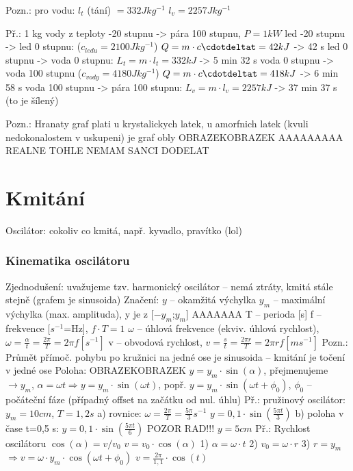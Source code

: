 \documentclass{article}
\begin{document}
Pozn.: pro vodu: $l_t$ (tání) $= 332 Jkg^{-1}$
$l_v = 2257 Jkg^{-1}$

Př.: 1 kg vody z teploty -20 stupnu -> pára 100 stupnu, $P = 1 kW$
led -20 stupnu -> led 0 stupnu: ($c_{ledu} = 2100 Jkg^{-1}$) $Q = m\cdot c\cdotdeltat = 42 kJ$ -> 42 s
led 0 stupnu -> voda 0 stupnu: $L_t = m\cdot l_t = 332 kJ$ -> 5 min 32 s
voda 0 stupnu -> voda 100 stupnu ($c_{vody} = 4180 Jkg^{-1}$) $Q = m\cdot c\cdotdeltat = 418 kJ$ -> 6 min 58 s
voda 100 stupnu -> pára 100 stupnu: $L_v = m\cdot l_v = 2257 kJ$ -> 37 min 37 s (to je šílený)

Pozn.: Hranaty graf plati u krystalickych latek, u amorfnich latek (kvuli nedokonalostem v uskupeni) je graf obly OBRAZEKOBRAZEK
AAAAAAAAA REALNE TOHLE NEMAM SANCI DODELAT

\part{Kmitání}
Oscilátor: cokoliv co kmitá, např. kyvadlo, pravítko (lol)

\section{Kinematika oscilátoru}
Zjednodušení: uvažujeme tzv. harmonický oscilátor -- nemá ztráty, kmitá stále stejně (grafem je sinusoida)
Značení: $y$ -- okamžitá výchylka
         $y_m$ -- maximální výchylka (max. amplituda), y je z [$-y_m$;$y_m$] AAAAAAA
         T -- perioda [s]
         f -- frekvence [$s^{-1}$=Hz], $f\cdot T=1$
        $\omega$ -- úhlová frekvence (ekviv. úhlová rychlost), $\omega=\frac{\alpha}{t}=\frac{2\pi}{T}=2\pi f [s^{-1}]$
        v -- obvodová rychlost, $v=\frac{s}{t}=\frac{2\pi r}{T}=2\pi rf [ms^{-1}]$
Pozn.: Průmět přímoč. pohybu po kružnici na jedné ose je sinusoida -- kmitání je točení v jedné ose
Poloha: OBRAZEKOBRAZEK $y=y_m\cdot \sin(\alpha)$, přejmenujeme $\rightarrow y_m$, $\alpha = \omega t \Rightarrow y=y_m\cdot \sin(\omega t)$, popř. $y=y_m\cdot \sin(\omega t+{\phi}_0)$, ${\phi}_0$ -- počáteční fáze (případný offset na začátku od nul. úhlu)
Př.: pružinový oscilátor: $y_m=10cm$, $T=1,2s$
        a) rovnice: $\omega = \frac{2\pi}{T}=\frac{5\pi}{3}s^{-1}$
                    $y=0,1\cdot \sin(\frac{5\pi t}{3})$
        b) poloha v čase t=0,5 s: $y=0,1\cdot \sin(\frac{5\pi t}{6})$ POZOR RAD!!!
                                  $y=5cm$
Př.: Rychlost oscilátoru
     $\cos (\alpha) = v/v_0$
     $v=v_0\cdot \cos (\alpha)$
        1) $\alpha = \omega \cdot t$
        2) $v_0 = \omega \cdot r$
        3) $r = y_m$
     $\Rightarrow v = \omega \cdot y_m \cdot \cos(\omega t + {\phi}_0)$
     $v = \frac{2 \pi}{1,1}\cdot \cos(t)$
\end{document}
